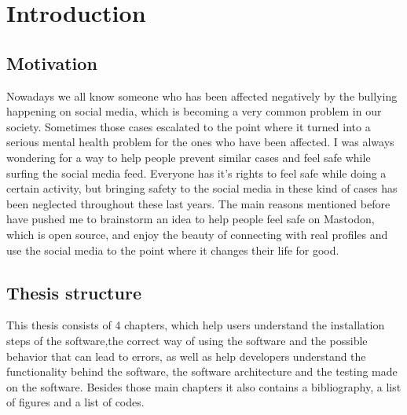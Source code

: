 \chapter{Introduction}
\label{ch:intro}

\section{Motivation}
Nowadays we all know someone who has been affected negatively
by the bullying happening on social media, which is becoming
a very common problem in our society. Sometimes those cases
escalated to the point where it turned into a serious mental
health problem for the ones who have been affected. I was
always wondering for a way to help people prevent similar
cases and feel safe while surfing the social media feed.
Everyone has it's rights to feel safe while doing a certain
activity, but bringing safety to the social media in these
kind of cases has been neglected throughout these last years.
\newline
The main reasons mentioned before have pushed me to brainstorm
an idea to help people feel safe on Mastodon, which is open source,
and enjoy the beauty of connecting with real profiles and use the
social media to the point where it changes their life for good.

\section{Thesis structure}
This thesis consists of 4 chapters, which help users understand the
installation steps of the software,the correct way of using the software 
and the possible behavior that can lead to errors, as well as help developers
understand the functionality behind the software, 
the software architecture and the testing made on the software.
\newline
Besides those main chapters it also contains a bibliography,
a list of figures and a list of codes.
